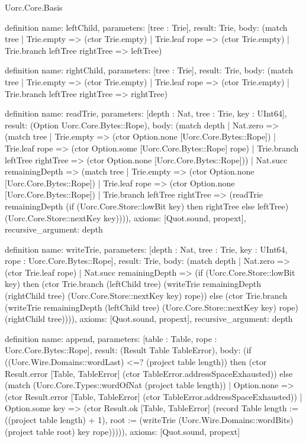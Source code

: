 \begin{lexlean}{Uorc.Core.Basis}
\begin{semanticmodule}
definition{
  name: leftChild,
  parameters: [tree : Trie],
  result: Trie,
  body: (match tree
    | Trie.empty => (ctor Trie.empty)
    | Trie.leaf rope => (ctor Trie.empty)
    | Trie.branch leftTree rightTree => leftTree)
}

definition{
  name: rightChild,
  parameters: [tree : Trie],
  result: Trie,
  body: (match tree
    | Trie.empty => (ctor Trie.empty)
    | Trie.leaf rope => (ctor Trie.empty)
    | Trie.branch leftTree rightTree => rightTree)
}

definition{
  name: readTrie,
  parameters: [depth : Nat, tree : Trie, key : UInt64],
  result: (Option Uorc.Core.Bytes::Rope),
  body: (match depth
    | Nat.zero => (match tree
      | Trie.empty => (ctor Option.none [Uorc.Core.Bytes::Rope])
      | Trie.leaf rope => (ctor Option.some [Uorc.Core.Bytes::Rope] rope)
      | Trie.branch leftTree rightTree => (ctor Option.none [Uorc.Core.Bytes::Rope]))
    | Nat.succ remainingDepth => (match tree
      | Trie.empty => (ctor Option.none [Uorc.Core.Bytes::Rope])
      | Trie.leaf rope => (ctor Option.none [Uorc.Core.Bytes::Rope])
      | Trie.branch leftTree rightTree => (readTrie remainingDepth (if (Uorc.Core.Store::lowBit key) then rightTree else leftTree) (Uorc.Core.Store::nextKey key)))),
  axioms: [Quot.sound, propext],
  recursive_argument: depth
}

definition{
  name: writeTrie,
  parameters: [depth : Nat, tree : Trie, key : UInt64, rope : Uorc.Core.Bytes::Rope],
  result: Trie,
  body: (match depth
    | Nat.zero => (ctor Trie.leaf rope)
    | Nat.succ remainingDepth => (if (Uorc.Core.Store::lowBit key) then (ctor Trie.branch (leftChild tree) (writeTrie remainingDepth (rightChild tree) (Uorc.Core.Store::nextKey key) rope)) else (ctor Trie.branch (writeTrie remainingDepth (leftChild tree) (Uorc.Core.Store::nextKey key) rope) (rightChild tree)))),
  axioms: [Quot.sound, propext],
  recursive_argument: depth
}

definition{
  name: append,
  parameters: [table : Table, rope : Uorc.Core.Bytes::Rope],
  result: (Result Table TableError),
  body: (if ((Uorc.Wire.Domains::wordLast) <=? (project table length)) then (ctor Result.error [Table, TableError] (ctor TableError.addressSpaceExhausted)) else (match (Uorc.Core.Types::wordOfNat (project table length))
    | Option.none => (ctor Result.error [Table, TableError] (ctor TableError.addressSpaceExhausted))
    | Option.some key => (ctor Result.ok [Table, TableError] (record Table {length := ((project table length) + 1), root := (writeTrie (Uorc.Wire.Domains::wordBits) (project table root) key rope)})))),
  axioms: [Quot.sound, propext]
}


\end{semanticmodule}
\end{lexlean}
